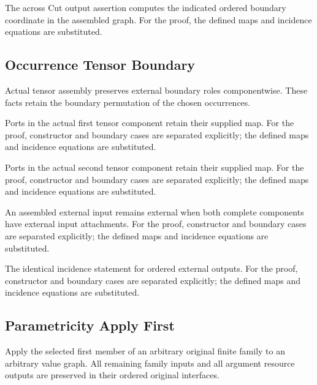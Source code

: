 The across Cut output assertion computes the indicated ordered boundary coordinate in the assembled graph.
For the proof, the defined maps and incidence equations are substituted.
\par{}

\subsection{Occurrence Tensor Boundary}
Actual tensor assembly preserves external boundary roles componentwise. These facts retain the boundary permutation of the chosen occurrences.

Ports in the actual first tensor component retain their supplied map.
For the proof, constructor and boundary cases are separated explicitly; the defined maps and incidence equations are substituted.
\par{}

Ports in the actual second tensor component retain their supplied map.
For the proof, constructor and boundary cases are separated explicitly; the defined maps and incidence equations are substituted.
\par{}

An assembled external input remains external when both complete components have external input attachments.
For the proof, constructor and boundary cases are separated explicitly; the defined maps and incidence equations are substituted.
\par{}

The identical incidence statement for ordered external outputs.
For the proof, constructor and boundary cases are separated explicitly; the defined maps and incidence equations are substituted.
\par{}

\subsection{Parametricity Apply First}
Apply the selected first member of an arbitrary original finite family to an arbitrary value graph. All remaining family inputs and all argument resource outputs are preserved in their ordered original interfaces.

